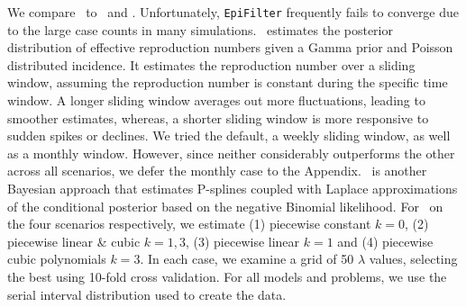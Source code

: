 We compare \RtEstim\ to \EpiEstim\ and \EpiLPS. Unfortunately,
\texttt{EpiFilter} frequently fails to converge due to the large case counts in
many simulations. \EpiEstim\ estimates the posterior distribution of effective
reproduction numbers given a Gamma prior and Poisson distributed incidence. It
estimates the reproduction number over a sliding window, assuming the
reproduction number is constant during the specific time window. A longer
sliding window averages out more fluctuations, leading to smoother estimates,
whereas, a shorter sliding window is more responsive to sudden spikes or
declines. We tried the default, a weekly sliding window, as well as a monthly
window. However, since neither considerably outperforms the other across all
scenarios, we defer the monthly case to the Appendix. \EpiLPS\ is another
Bayesian approach that estimates P-splines coupled with Laplace approximations
of the conditional posterior based on the negative Binomial likelihood. For
\RtEstim\ on the four scenarios respectively, we estimate (1) piecewise constant
$k=0$, (2) piecewise linear \& cubic $k=1,3$, (3) piecewise linear $k=1$ and (4)
piecewise cubic polynomials $k=3$. In each case, we examine a grid of 50
$\lambda$ values, selecting the best using 10-fold cross validation. For all models and
problems, we use the serial interval distribution used to create the data. 

